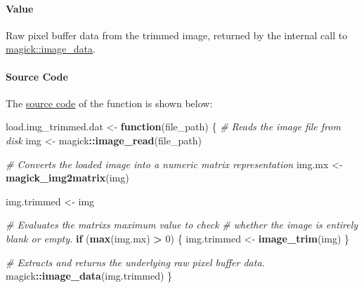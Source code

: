 \documentclass[
]{report}
\newenvironment{Shaded}{\begin{snugshade}}{\end{snugshade}}
\newcommand{\CommentTok}[1]{\textcolor[rgb]{0.56,0.35,0.01}{\textit{#1}}}
\newcommand{\ControlFlowTok}[1]{\textcolor[rgb]{0.13,0.29,0.53}{\textbf{#1}}}
\newcommand{\DecValTok}[1]{\textcolor[rgb]{0.00,0.00,0.81}{#1}}
\newcommand{\FunctionTok}[1]{\textcolor[rgb]{0.13,0.29,0.53}{\textbf{#1}}}
\newcommand{\NormalTok}[1]{#1}
\newcommand{\OtherTok}[1]{\textcolor[rgb]{0.56,0.35,0.01}{#1}}
\newcommand{\SpecialCharTok}[1]{\textcolor[rgb]{0.81,0.36,0.00}{\textbf{#1}}}
\begin{document}
\protect{}\label{func.load.img_trimmed.dat.value}
\paragraph{Value}\label{value-2}

\hfill\break

Raw pixel buffer data from the trimmed image, returned by the internal call to \href{https://docs.ropensci.org/magick/reference/editing.html\#details}{magick::image\_data}.

\newpage

\protect{}\label{func.load.img_trimmed.dat.code}
\paragraph{Source Code}\label{source-code-3}

\hfill\break

The \href{https://github.com/AzKurban-edX-DS/edx.capstone.choose-your-own/blob/main/r/support-functions/data-helper.R\#L287}{source code} of the function is shown below:

\begin{Shaded}
\begin{Highlighting}[]
\NormalTok{load.img\_trimmed.dat }\OtherTok{\textless{}{-}} \ControlFlowTok{function}\NormalTok{(file\_path) \{}
  \CommentTok{\# Reads the image file from disk}
\NormalTok{  img }\OtherTok{\textless{}{-}}\NormalTok{ magick}\SpecialCharTok{::}\FunctionTok{image\_read}\NormalTok{(file\_path)}
  
  \CommentTok{\# Converts the loaded image into a numeric matrix representation}
\NormalTok{  img.mx }\OtherTok{\textless{}{-}} \FunctionTok{magick\_img2matrix}\NormalTok{(img)}
  
\NormalTok{  img.trimmed }\OtherTok{\textless{}{-}}\NormalTok{ img}

  \CommentTok{\#\textquotesingle{} Evaluates the matrix\textquotesingle{}s maximum value to check }
  \CommentTok{\#\textquotesingle{} whether the image is entirely blank or empty.}
  \ControlFlowTok{if}\NormalTok{ (}\FunctionTok{max}\NormalTok{(img.mx) }\SpecialCharTok{\textgreater{}} \DecValTok{0}\NormalTok{) \{}
\NormalTok{    img.trimmed }\OtherTok{\textless{}{-}} \FunctionTok{image\_trim}\NormalTok{(img)}
\NormalTok{  \}}
  
  \CommentTok{\# Extracts and returns the underlying raw pixel buffer data.}
\NormalTok{  magick}\SpecialCharTok{::}\FunctionTok{image\_data}\NormalTok{(img.trimmed)}
\NormalTok{\}}
\end{Highlighting}
\end{Shaded}
\end{document}

